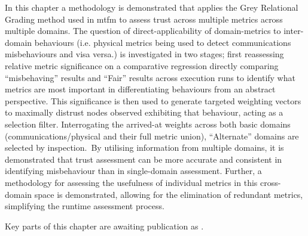 In this chapter a methodology is demonstrated that applies the Grey Relational Grading method used in \gls{mtfm} to assess trust across multiple metrics across multiple domains.
The question of direct-applicability of domain-metrics to inter-domain behaviours (i.e. physical metrics being used to detect communications misbehaviours and visa versa.) is investigated in two stages; first reassessing relative metric significance on a comparative regression directly comparing ``misbehaving'' results and ``Fair'' results across execution runs to identify what metrics are most important in  differentiating behaviours from an abstract perspective. 
This significance is then used to generate targeted weighting vectors to maximally distrust nodes observed exhibiting that behaviour, acting as a selection filter.
Interrogating the arrived-at weights across both basic domains (communications/physical and their full metric union), ``Alternate'' domains are selected by inspection.\
By utilising information from multiple domains, it is demonstrated that trust assessment can be more accurate and consistent in identifying misbehaviour than in single-domain assessment.
Further, a methodology for assessing the usefulness of individual metrics in this cross-domain space is demonstrated, allowing for the elimination of redundant metrics, simplifying the runtime assessment process.

{\sloppy \raggedright
Key parts of this chapter are awaiting publication as  .
}


